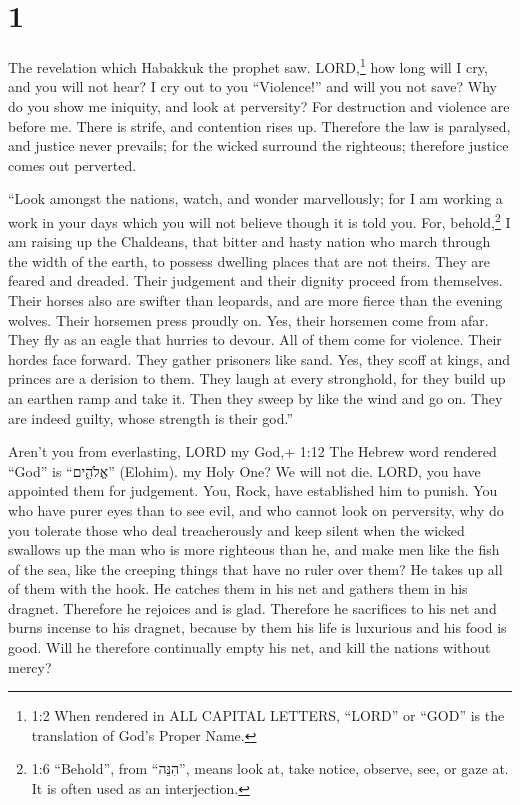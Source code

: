 \hypertarget{section}{%
\section{1}\label{section}}

 The revelation which Habakkuk the prophet saw. 
LORD,\footnote{1:2 When rendered in ALL CAPITAL LETTERS, ``LORD'' or
  ``GOD'' is the translation of God's Proper Name.} how long will I cry,
and you will not hear? I cry out to you ``Violence!'' and will you not
save?  Why do you show me iniquity, and look at perversity?
For destruction and violence are before me. There is strife, and
contention rises up.  Therefore the law is paralysed, and
justice never prevails; for the wicked surround the righteous; therefore
justice comes out perverted.

 ``Look amongst the nations, watch, and wonder marvellously;
for I am working a work in your days which you will not believe though
it is told you.  For, behold,\footnote{1:6 ``Behold'', from
  ``הִנֵּה'', means look at, take notice, observe, see, or gaze at. It
  is often used as an interjection.} I am raising up the Chaldeans, that
bitter and hasty nation who march through the width of the earth, to
possess dwelling places that are not theirs.  They are
feared and dreaded. Their judgement and their dignity proceed from
themselves.  Their horses also are swifter than leopards,
and are more fierce than the evening wolves. Their horsemen press
proudly on. Yes, their horsemen come from afar. They fly as an eagle
that hurries to devour.  All of them come for violence.
Their hordes face forward. They gather prisoners like sand.
 Yes, they scoff at kings, and princes are a derision to
them. They laugh at every stronghold, for they build up an earthen ramp
and take it.  Then they sweep by like the wind and go on.
They are indeed guilty, whose strength is their god.''

 Aren't you from everlasting, LORD my God,+ 1:12 The Hebrew
word rendered ``God'' is ``אֱלֹהִ֑ים'' (Elohim). my Holy One? We will
not die. LORD, you have appointed them for judgement. You, Rock, have
established him to punish.  You who have purer eyes than to
see evil, and who cannot look on perversity, why do you tolerate those
who deal treacherously and keep silent when the wicked swallows up the
man who is more righteous than he,  and make men like the
fish of the sea, like the creeping things that have no ruler over them?
 He takes up all of them with the hook. He catches them in
his net and gathers them in his dragnet. Therefore he rejoices and is
glad.  Therefore he sacrifices to his net and burns incense
to his dragnet, because by them his life is luxurious and his food is
good.  Will he therefore continually empty his net, and
kill the nations without mercy?

